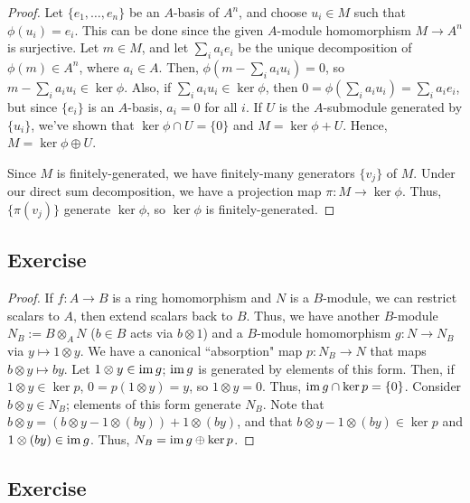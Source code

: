\begin{proof}
Let $\{e_1,\ldots,e_n\}$ be an $A$-basis of $A^n$, and choose $u_i \in M$ such that $\phi(u_i) = e_i$. This can be done since the given $A$-module homomorphism $M \to A^n$ is surjective. 
Let $m \in M$, and let $\sum_i a_i e_i$ be the unique decomposition of $\phi(m) \in A^n$, where $a_i \in A$. Then, $\phi\left(m - \sum_i a_i u_i\right) = 0$, so $m - \sum_i a_i u_i \in \ker\phi$.
Also, if $\sum_i a_i u_i \in \ker \phi$, then $0 = \phi\left(\sum_i a_i u_i\right) = \sum_i a_i e_i$, but since $\{e_i\}$ is an $A$-basis, $a_i = 0$ for all $i$. If $U$ is the $A$-submodule generated
by $\{u_i\}$, we've shown that $\ker \phi \cap U = \{0\}$ and $M = \ker \phi + U$. Hence, $M = \ker \phi \oplus U$.

Since $M$ is finitely-generated, we have finitely-many generators $\{v_j\}$ of $M$. Under our direct sum decomposition, we have a projection map $\pi : M \to \ker \phi$. 
Thus, $\{\pi(v_j)\}$ generate $\ker \phi$, so $\ker\phi$ is finitely-generated.
\end{proof}

\subsection{Exercise}\label{2.13} %

\begin{proof}
If $f : A \to B$ is a ring homomorphism and $N$ is a $B$-module, we can restrict scalars to $A$, then extend scalars back to $B$. Thus, we have another $B$-module
$N_B := B \otimes_A N$ ($b \in B$ acts via $b \otimes 1$) and a $B$-module homomorphism $g: N \to N_B$ via $y \mapsto 1 \otimes y$. We have a canonical ``absorption" map $p : N_B \to N$ that maps
$b \otimes y \mapsto by$. Let $1 \otimes y \in \operatorname{im} g$; $\operatorname{im} g$ is generated by elements of this form. Then, if $1 \otimes y \in \ker p$, $0 = p(1\otimes y) = y$, so $1 \otimes y = 0$. 
Thus, $\operatorname{im} g \cap \ker p = \{0\}$. Consider $b \otimes y \in N_B$; elements of this form generate $N_B$. Note that $b \otimes y = (b \otimes y - 1 \otimes (by)) + 1 \otimes (by)$,
and that $b \otimes y - 1 \otimes (by) \in \ker p$ and $1 \otimes (by) \in \operatorname{im} g$. Thus, $N_B = \operatorname{im} g \oplus \ker p$.
\end{proof}

\subsection{Exercise}\label{2.14} %

